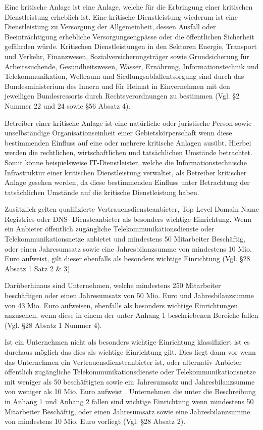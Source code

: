 \documentclass[11pt,a4paper]{article}   %
\begin{document}
        Eine kritische Anlage ist eine Anlage, welche für die Erbringung einer kritischen Dienstleistung erheblich ist. Eine kritische Dienstleistung wiederum ist eine Dienstleistung zu Versorgung der Allgemeinheit, dessen Ausfall oder Beeinträchtigung erhebliche Versorgungsengpässe oder die öffentlichen Sicherheit gefährden würde. Kritischen Dienstleistungen in den Sektoren Energie, Transport und Verkehr, Finanzwesen, Sozialversicherungsträger sowie Grundsicherung für Arbeitssuchende, Gesundheitswesen, Wasser, Ernährung, Informationstechnik und Telekommunikation, Weltraum und Siedlungsabfallentsorgung sind durch das Bundesministerium des Innern und für Heimat in Einvernehmen mit den jeweiligen Bundesressorts durch Rechtsverordnungen zu bestimmen (Vgl. §2 Nummer 22 und 24 sowie §56 Absatz 4).

        Betreiber einer kritische Anlage ist eine natürliche oder juristische Person sowie unselbständige Organisationseinheit einer Gebietskörperschaft wenn diese bestimmenden Einfluss auf eine oder mehrere kritische Anlagen ausübt. Hierbei werden die rechtlichen, wirtschaftlichen und tatsächlichen Umstände betrachtet. Somit könne beispielsweise IT-Dienstleister, welche die Informationstechnische Infrastruktur einer kritischen Dienstleistung verwaltet, als Betreiber kritischer Anlage gesehen werden, da diese bestimmenden Einfluss unter Betrachtung der tatsächlichen Umstände auf die kritische Dienstleistung haben.

        Zusätzlich gelten qualifizierte Vertrauensdiensteanbieter, Top Level Domain Name Registries oder DNS- Diensteanbieter als besonders wichtige Einrichtung. Wenn ein Anbieter öffentlich zugängliche Telekommunikationsdienste oder Telekommunikationsnetze anbietet und mindestens 50 Mitarbeiter Beschäftig, oder einen Jahresumsatz sowie eine Jahresbilanzsumme von mindestens 10 Mio. Euro aufweist, gilt dieser ebenfalls als besonders wichtige Einrichtung (Vgl. §28 Absatz 1 Satz 2 \& 3).

        Darüberhinaus sind Unternehmen, welche mindestens 250 Mitarbeiter beschäftigen oder einen Jahresumsatz von 50 Mio. Euro und Jahresbilanzsumme von 43 Mio. Euro aufweisen, ebenfalls als besonders wichtige Einrichtungen anzusehen, wenn diese in einem der unter Anhang 1 beschriebenen Bereiche fallen (Vgl. §28 Absatz 1 Nummer 4).

        Ist ein Unternehmen nicht als besonders wichtige Einrichtung klassifiziert ist es durchaus möglich das dies als wichtige Einrichtung gilt. Dies liegt dann vor wenn das Unternehmen ein Vertrauensdiensteanbieter ist, oder alternativ Anbieter öffentlich zugängliche Telekommunikationsdienste oder Telekommunikationsnetze mit weniger als 50 beschäftigten sowie ein Jahresumsatz und Jahresbilanzsumme von weniger als 10 Mio. Euro aufweist . Unternehmen die unter die Beschreibung in Anhang 1 und Anhang 2 fallen sind wichtige Einrichtung wenn mindestens 50 Mitarbeiter Beschäftig, oder einen Jahresumsatz sowie eine Jahresbilanzsumme von mindestens 10 Mio. Euro vorliegt (Vgl. §28 Absatz 2).
\end{document}
